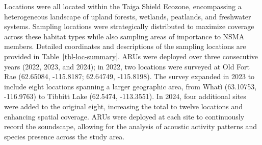 \documentclass[
  letterpaper,
  DIV=11,
  numbers=noendperiod,
  oneside]{scrartcl}
\begin{document}
Locations were all located within the Taiga Shield Ecozone, encompassing
a heterogeneous landscape of upland forests, wetlands, peatlands, and
freshwater systems. Sampling locations were strategically distributed to
maximize coverage across these habitat types while also sampling areas
of importance to NSMA members. Detailed coordinates and descriptions of
the sampling locations are provided in Table~\ref{tbl-loc-summary}. ARUs
were deployed over three consecutive years (2022, 2023, and 2024); in
2022, two locations were surveyed at Old Fort Rae (62.65084, -115.8187;
62.64749, -115.8198). The survey expanded in 2023 to include eight
locations spanning a larger geographic area, from Whatì (63.10753,
-116.9763) to Tibbitt Lake (62.5474, -113.3551). In 2024, four
additional sites were added to the original eight, increasing the total
to twelve locations and enhancing spatial coverage. ARUs were deployed
at each site to continuously record the soundscape, allowing for the
analysis of acoustic activity patterns and species presence across the
study area.
\end{document}
